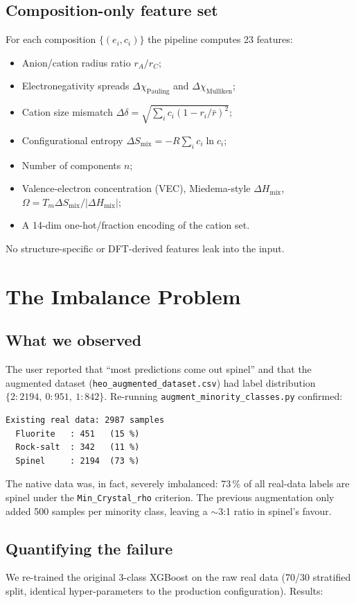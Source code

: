 \documentclass[11pt]{article}
\begin{document}
\subsection{Composition-only feature set}
For each composition $\{(e_i, c_i)\}$ the pipeline computes 23 features:
\begin{itemize}
  \item Anion/cation radius ratio $r_A/r_C$;
  \item Electronegativity spreads $\Delta\chi_{\text{Pauling}}$ and $\Delta\chi_{\text{Mulliken}}$;
  \item Cation size mismatch $\Delta\delta = \sqrt{\sum_i c_i (1 - r_i/\bar r)^2}$;
  \item Configurational entropy $\Delta S_\text{mix} = -R\sum_i c_i \ln c_i$;
  \item Number of components $n$;
  \item Valence-electron concentration (VEC), Miedema-style $\Delta H_\text{mix}$, $\Omega = T_m \Delta S_\text{mix} / |\Delta H_\text{mix}|$;
  \item A 14-dim one-hot/fraction encoding of the cation set.
\end{itemize}
No structure-specific or DFT-derived features leak into the input.

\section{The Imbalance Problem}
\label{sec:problem}

\subsection{What we observed}
The user reported that ``most predictions come out spinel'' and that the
augmented dataset
(\texttt{heo\_augmented\_dataset.csv}) had label distribution
$\{2: 2194,\ 0:951,\ 1:842\}$. Re-running
\texttt{augment\_minority\_classes.py} confirmed:
\begin{verbatim}
Existing real data: 2987 samples
  Fluorite   : 451   (15 %)
  Rock-salt  : 342   (11 %)
  Spinel     : 2194  (73 %)
\end{verbatim}
The native data was, in fact, severely imbalanced: 73\,\% of all real-data
labels are spinel under the \texttt{Min\_Crystal\_rho} criterion. The previous
augmentation only added 500 samples per minority class, leaving a
$\sim$3:1 ratio in spinel's favour.

\subsection{Quantifying the failure}
We re-trained the original 3-class XGBoost on the raw real data
(70/30 stratified split, identical hyper-parameters to the production
configuration). Results:
\end{document}
